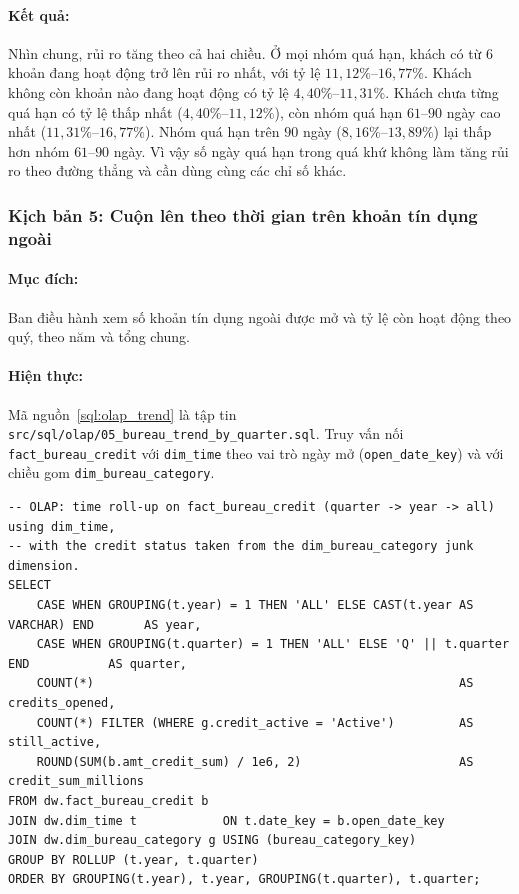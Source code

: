 \paragraph{Kết quả:} Nhìn chung, rủi ro tăng theo cả hai chiều. Ở mọi nhóm quá hạn, khách có từ $6$ khoản đang hoạt động trở lên rủi ro nhất, với tỷ lệ $11{,}12\%$--$16{,}77\%$. Khách không còn khoản nào đang hoạt động có tỷ lệ $4{,}40\%$--$11{,}31\%$. Khách chưa từng quá hạn có tỷ lệ thấp nhất ($4{,}40\%$--$11{,}12\%$), còn nhóm quá hạn $61$--$90$ ngày cao nhất ($11{,}31\%$--$16{,}77\%$). Nhóm quá hạn trên $90$ ngày ($8{,}16\%$--$13{,}89\%$) lại thấp hơn nhóm $61$--$90$ ngày. Vì vậy số ngày quá hạn trong quá khứ không làm tăng rủi ro theo đường thẳng và cần dùng cùng các chỉ số khác.

\subsubsection*{Kịch bản 5: Cuộn lên theo thời gian trên khoản tín dụng ngoài}
\paragraph{Mục đích:} Ban điều hành xem số khoản tín dụng ngoài được mở và tỷ lệ còn hoạt động theo quý, theo năm và tổng chung.
\paragraph{Hiện thực:} Mã nguồn~\ref{sql:olap_trend} là tập tin \texttt{src/sql/olap/}\allowbreak\texttt{05\_bureau\_trend\_by\_quarter.sql}. Truy vấn nối \texttt{fact\_bureau\_credit} với \texttt{dim\_time} theo vai trò ngày mở (\texttt{open\_date\_key}) và với chiều gom \texttt{dim\_bureau\_category}.

\begin{listing}[H]
	\footnotesize
	\begin{verbatim}
-- OLAP: time roll-up on fact_bureau_credit (quarter -> year -> all) using dim_time,
-- with the credit status taken from the dim_bureau_category junk dimension.
SELECT
    CASE WHEN GROUPING(t.year) = 1 THEN 'ALL' ELSE CAST(t.year AS VARCHAR) END       AS year,
    CASE WHEN GROUPING(t.quarter) = 1 THEN 'ALL' ELSE 'Q' || t.quarter END           AS quarter,
    COUNT(*)                                                   AS credits_opened,
    COUNT(*) FILTER (WHERE g.credit_active = 'Active')         AS still_active,
    ROUND(SUM(b.amt_credit_sum) / 1e6, 2)                      AS credit_sum_millions
FROM dw.fact_bureau_credit b
JOIN dw.dim_time t            ON t.date_key = b.open_date_key
JOIN dw.dim_bureau_category g USING (bureau_category_key)
GROUP BY ROLLUP (t.year, t.quarter)
ORDER BY GROUPING(t.year), t.year, GROUPING(t.quarter), t.quarter;
\end{verbatim}
	\caption{Truy vấn cuộn lên theo năm và quý trên khoản tín dụng ngoài}
	\label{sql:olap_trend}
\end{listing}

